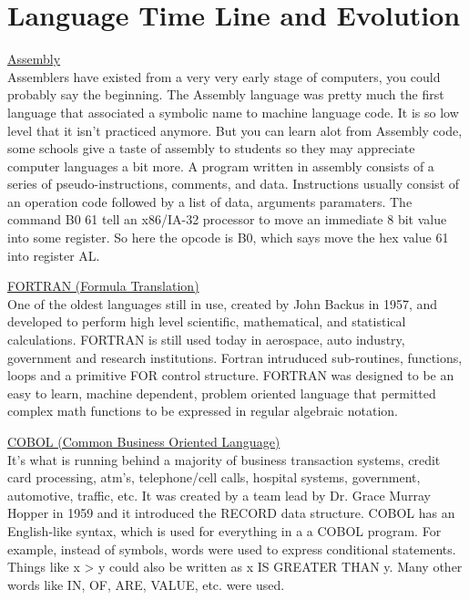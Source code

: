 \documentclass[letterpaper, 10 pt, conference]{IEEEtran}
\begin{document}
\section{Language Time Line and Evolution}
\noindent \underline{Assembly} \\
Assemblers have existed from a very very early stage of computers, you could probably say the beginning. The Assembly language was pretty much the first language that associated a symbolic name to machine language code. It is so low level that it isn't practiced anymore. But you can learn alot from Assembly code, some schools give a taste of assembly to students so they may appreciate computer languages a bit more. A program written in assembly consists of a series of pseudo-instructions, comments, and data. Instructions usually consist of an operation code followed by a list of data, arguments paramaters. The command B0 61 tell an x86/IA-32 processor to move an immediate 8 bit value into some register. So here the opcode is B0, which says move the hex value 61 into register AL.\bigskip

\noindent \underline{FORTRAN (Formula Translation)} \\
One of the oldest languages still in use,  created by John Backus in 1957, and developed to perform high level scientific, mathematical, and statistical calculations. FORTRAN is still used today in aerospace, auto industry, government and research institutions. Fortran intruduced sub-routines, functions, loops and a primitive FOR control structure. FORTRAN was designed to be an easy to learn, machine dependent, problem oriented language that permitted complex math functions to be expressed in regular algebraic notation.\bigskip

\noindent \underline{COBOL (Common Business Oriented Language)}\\
It's what is running behind a majority of business transaction systems, credit card processing, atm's, telephone/cell calls, hospital systems, government, automotive, traffic, etc. It was created by a team lead by Dr. Grace Murray Hopper in 1959 and it introduced the RECORD data structure. COBOL has an English-like syntax, which is used for everything in a a COBOL program. For example, instead of symbols, words were used to express conditional statements. Things like x > y could also be written as x IS GREATER THAN y. Many other words like IN, OF, ARE, VALUE, etc. were used.\bigskip
\end{document}
